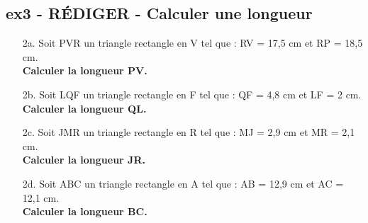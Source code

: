 \documentclass[11pt]{article}
\begin{document}
\Pointilles[20]
\newpage

\subsection*{ex3 - \textbf{RÉDIGER} - Calculer une longueur}


\begin{enumerate}
  \item[2a.]Soit PVR un triangle rectangle en V tel que : RV = 17,5 cm et RP = 18,5 cm. \\
  \textbf{Calculer la longueur PV.}

  \item[2b.]Soit LQF un triangle rectangle en F tel que : QF = 4,8 cm et LF = 2 cm. \\
  \textbf{Calculer la longueur QL.}

  \item[2c.]Soit JMR un triangle rectangle en R tel que : MJ = 2,9 cm et MR = 2,1 cm. \\
  \textbf{Calculer la longueur JR.}

  \item[2d.]Soit ABC un triangle rectangle en A tel que : AB = 12,9 cm et AC = 12,1 cm. \\
  \textbf{Calculer la longueur BC.}

\end{enumerate}

\Pointilles[43]
\end{document}
